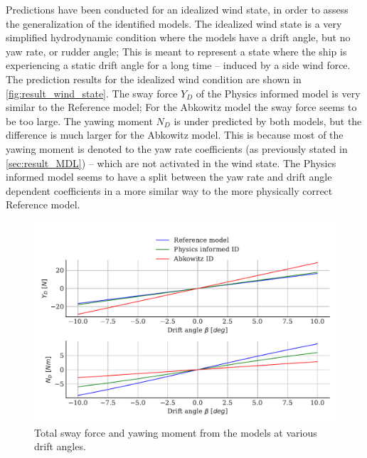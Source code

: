 Predictions have been conducted for an idealized wind state, in order to assess the generalization of the  identified models. The idealized wind state is a very simplified hydrodynamic condition where the models have a drift angle, but no yaw rate, or rudder angle; This is meant to represent a state where the ship is experiencing a static drift angle for a long time -- induced by a side wind force.
The prediction results for the idealized wind condition are shown in \autoref{fig:result_wind_state}. The sway force $Y_D$ of the Physics informed model is very similar to the Reference model; For the Abkowitz model the sway force seems to be too large. The yawing moment $N_D$ is under predicted by both models, but the difference is much larger for the Abkowitz model. 
This is because most of the yawing moment is denoted to the yaw rate coefficients (as previously stated in \autoref{sec:result_MDL}) -- which are not activated in the wind state. 
The Physics informed model seems to have a split between the yaw rate and drift angle dependent coefficients in a more similar way to the more physically correct Reference model.
\label{sec:wind_state}
\begin{figure}[h!]
    \includegraphics[width=\columnwidth]{figures/result_wind_state.forces.pdf}
    \caption{Total sway force and yawing moment from the models at various drift angles.}
    \label{fig:result_wind_state}
\end{figure}